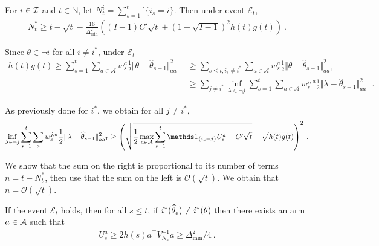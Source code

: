 \begin{theorem}
For $i\in\mathcal{I}$ and $t\in \mathbb{N}$, let $N_t^i = \sum_{s=1}^t \mathbb{I}\{i_s=i\}$. Then under event $\mathcal E_t$,
\begin{align*}
N_t^*
\ge t - \sqrt{t} - \frac{16}{\Delta_{\min}^2}\left((I-1)C'\sqrt{t} + (1 + \sqrt{I-1})^2 h(t)g(t)\right)
\: .
\end{align*}
\end{theorem}

Since $\theta \in \neg i$ for all $i\neq i^*$, under $\mathcal E_t$%
\begin{align*}
h(t)g(t)
\ge \sum_{s=1}^t \sum_{a\in \mathcal A} w_s^a \frac{1}{2}\Vert \theta - \hat{\theta}_{s-1} \Vert_{aa^\top}^2
&\ge \sum_{s\le t, i_s\neq i^*} \sum_{a \in \mathcal A} w_s^a \frac{1}{2}\Vert \theta - \hat{\theta}_{s-1} \Vert_{aa^\top}^2
\\
&\ge \sum_{j \neq i^*} \inf_{\lambda\in \neg j} \sum_{s = 1}^t \sum_{a \in \mathcal A} w_s^{j,a} \frac{1}{2}\Vert \lambda - \hat{\theta}_{s-1} \Vert_{aa^\top}^2
\: .
\end{align*}

As previously done for $i^*$, we obtain for all $j\neq i^*$,
\begin{align*}
\inf_{\lambda\in \neg j} \sum_{s = 1}^t \sum_a w_s^{j,a} \frac{1}{2}\Vert \lambda - \hat{\theta}_{s-1} \Vert_{aa^\top}^2
\ge  \left(\sqrt{\frac{1}{2}\max_{a\in\cA} \sum_{s=1}^t \ind_{\{i_s=j\}} U_s^a - C'\sqrt{t}} - \sqrt{h(t)g(t)}\right)^2
\: .
\end{align*}

We show that the sum on the right is proportional to its number of terms $n = t - N_t^*$, then use that the sum on the left is $\mathcal O(\sqrt{t})$. We obtain that $n = \mathcal O(\sqrt{t})$.

\begin{lemma}
If the event $\mathcal E_t$ holds, then for all $s\le t$, if $i^*(\widehat{\theta}_s) \neq i^*(\theta)$ then there exists an arm $a\in\mathcal{A}$ such that
\begin{align*}
U_s^a \ge 2 h(s) a^\top V_{N_s}^{-1}a \ge \Delta_{\min}^2/4 \: .
\end{align*}
\end{lemma}

